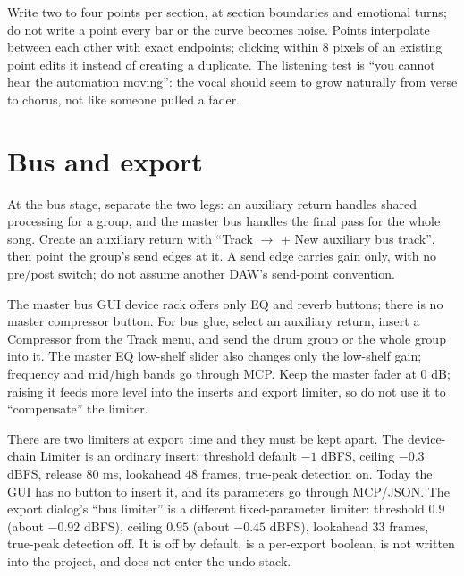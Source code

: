 Write two to four points per section, at section boundaries and emotional turns; do not write a point every bar or the curve becomes noise. Points interpolate between each other with exact endpoints; clicking within $8$ pixels of an existing point edits it instead of creating a duplicate. The listening test is ``you cannot hear the automation moving'': the vocal should seem to grow naturally from verse to chorus, not like someone pulled a fader.


\section{Bus and export}

At the bus stage, separate the two legs: an auxiliary return handles shared processing for a group, and the master bus handles the final pass for the whole song. Create an auxiliary return with ``Track $\rightarrow$ + New auxiliary bus track'', then point the group's send edges at it. A send edge carries gain only, with no pre/post switch; do not assume another DAW's send-point convention.

The master bus GUI device rack offers only EQ and reverb buttons; there is no master compressor button. For bus glue, select an auxiliary return, insert a Compressor from the Track menu, and send the drum group or the whole group into it. The master EQ low-shelf slider also changes only the low-shelf gain; frequency and mid/high bands go through MCP. Keep the master fader at $0$ dB; raising it feeds more level into the inserts and export limiter, so do not use it to ``compensate'' the limiter.

There are two limiters at export time and they must be kept apart. The device-chain Limiter is an ordinary insert: threshold default $-1$ dBFS, ceiling $-0.3$ dBFS, release $80$ ms, lookahead $48$ frames, true-peak detection on. Today the GUI has no button to insert it, and its parameters go through MCP/JSON. The export dialog's ``bus limiter'' is a different fixed-parameter limiter: threshold $0.9$ (about $-0.92$ dBFS), ceiling $0.95$ (about $-0.45$ dBFS), lookahead $33$ frames, true-peak detection off. It is off by default, is a per-export boolean, is not written into the project, and does not enter the undo stack.

